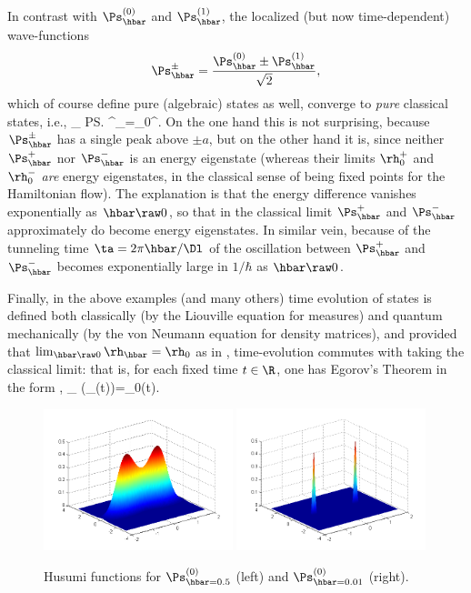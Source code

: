 \documentclass[12pt]{article}
\begin{document}
In contrast with $\Ps_{\hbar}^{(0)}$ and $\Ps_{\hbar}^{(1)}$, the localized (but now time-dependent) wave-functions
\begin{equation}
\Ps_{\hbar}^{\pm}= \frac{\Ps_{\hbar}^{(0)}\pm\Ps_{\hbar}^{(1)}}{\sqrt{2}}, \label{plusmin}
\end{equation}
which of course define pure (algebraic) states as well, converge to \emph{pure} classical states, i.e., 
\beq
\lim_{\hbar{}} \ps^{\pm}_{\hbar}=\rh_0^{\pm}.\label{1.7}
\eeq
On the one hand this is not surprising, because $\Ps_{\hbar}^{\pm}$ has a single peak above $\pm a$, but on the other hand it is, since neither $\Ps_{\hbar}^+$ nor $\Ps_{\hbar}^-$ is an energy eigenstate (whereas their limits $\rh_0^+$ and $\rh_0^-$ \emph{are} energy eigenstates, in the classical sense of being fixed points for the Hamiltonian flow). The explanation is that the energy difference  vanishes exponentially as $\hbar\raw 0$, so that  in the classical limit $\Ps_{\hbar}^+$ and $\Ps_{\hbar}^-$ approximately do become energy eigenstates. In similar vein, because of  the tunneling time  $\ta=2\pi\hbar/\Dl$ of the oscillation between $\Ps_{\hbar}^+$ and $\Ps_{\hbar}^-$  becomes exponentially large in $1/\hbar$ as $\hbar\raw 0$.

Finally, in the above examples (and many others) time evolution of states  is defined both classically (by the Liouville equation for measures) and quantum mechanically (by the von Neumann equation for density matrices), and provided that $\lim_{\hbar\raw 0}\rh_{\hbar}=\rh_0$ as in ,
time-evolution commutes with taking the classical limit: that is, 
for each fixed time $t\in\R$, one has Egorov's Theorem in the form \cite[Thm.\ II.2.7.2]{book}, \cite{Robert}
\beq
\lim_{\hbar{}} (\rh_{\hbar}(t))=\rh_0(t). \label{egorov}
\eeq

 \begin{figure}[t]
\begin{center}
\includegraphics[width=0.49\textwidth]{KL1H2,hbar=0,5.png}
\includegraphics[width=0.49\textwidth]{KL1H2,hbar=0,01-1.png}
\caption{Husumi functions for $\Ps_{\hbar=0.5}^{(0)}$ (left) and  $\Ps_{\hbar=0.01}^{(0)}$ (right).}
\label{HF}
\end{center}
\end{figure}
\newpage
\end{document}
